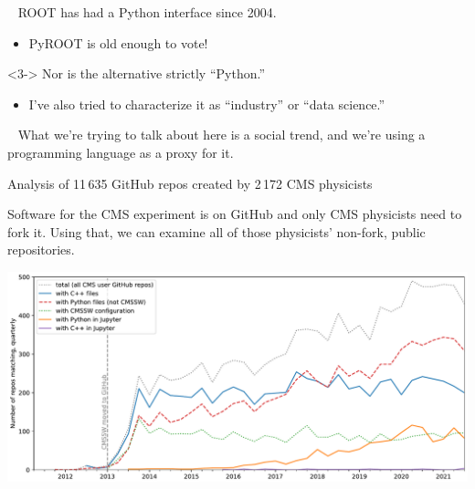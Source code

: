 \documentclass[aspectratio=169]{beamer}
\begin{document}
\begin{frame}{\mbox{ }}
\Large
\vspace{0.25 cm}
ROOT has had a Python interface since 2004.

\vspace{0.2 cm}
\begin{itemize}
\item<2-> PyROOT is old enough to vote!
\end{itemize}

\vspace{1.25 cm}
\begin{uncoverenv}<3->
Nor is the alternative strictly ``Python.''
\vspace{0.2 cm}
\begin{itemize}
\item<4-> I've also tried to characterize it as ``industry'' or ``data science.''
\end{itemize}
\end{uncoverenv}
\end{frame}

\begin{frame}{\mbox{ }}
\Large
What we're trying to talk about here is a social trend, and we're using a programming language as a proxy for it.
\end{frame}

\begin{frame}{Analysis of 11\,635 GitHub repos created by 2\,172 CMS physicists}
\vspace{0.25 cm}

Software for the CMS experiment is on GitHub and only CMS physicists need to fork it. Using that, we can examine all of those physicists' non-fork, public repositories.

\vspace{0.2 cm}

\includegraphics[width=\linewidth]{PLOTS/gihub-language-fullstudy.pdf}
\end{frame}
\end{document}
